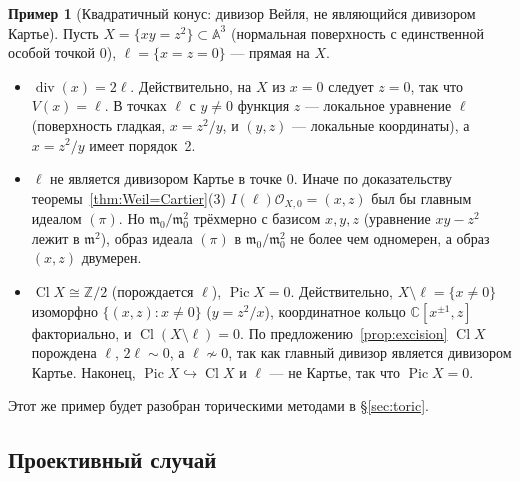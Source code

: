 \documentclass[11pt,a4paper]{article}
\theoremstyle{plain}
\theoremstyle{definition}
\newtheorem{example}[theorem]{Пример}
\theoremstyle{remark}
\renewcommand{\C}{\mathbb{C}}
\newcommand{\Z}{\mathbb{Z}}
\newcommand{\A}{\mathbb{A}}
\newcommand{\cO}{\mathcal{O}}
\newcommand{\mm}{\mathfrak{m}}
\DeclareMathOperator{\Pic}{Pic}
\DeclareMathOperator{\Cl}{Cl}
\DeclareMathOperator{\divv}{div}
\begin{document}
\begin{example}[Квадратичный конус: дивизор Вейля, не являющийся дивизором Картье]\label{ex:cone}
Пусть $X=\{xy=z^2\}\subset\A^3$ (нормальная поверхность с единственной особой точкой $0$),
$\ell=\{x=z=0\}$ --- прямая на $X$.
\begin{itemize}
\item $\divv(x)=2\ell$. Действительно, на $X$ из $x=0$ следует $z=0$, так что
$V(x)=\ell$. В точках $\ell$ с $y\ne0$ функция $z$ --- локальное уравнение $\ell$ (поверхность
гладкая, $x=z^2/y$, и $(y,z)$ --- локальные координаты), а $x=z^2/y$ имеет порядок~2.
\item $\ell$ не является дивизором Картье в точке $0$. Иначе по доказательству
теоремы~\ref{thm:Weil=Cartier}(3) $I(\ell)\cO_{X,0}=(x,z)$ был бы главным идеалом $(\pi)$.
Но $\mm_0/\mm_0^2$ трёхмерно с базисом $x,y,z$ (уравнение $xy-z^2$ лежит в $\mm^2$), образ
идеала $(\pi)$ в $\mm_0/\mm_0^2$ не более чем одномерен, а образ $(x,z)$ двумерен.
\item $\Cl X\cong\Z/2$ (порождается $\ell$), $\Pic X=0$. Действительно, $X\setminus\ell=\{x\ne0\}$
изоморфно $\{(x,z):x\ne0\}$ ($y=z^2/x$), координатное кольцо $\C[x^{\pm1},z]$ факториально,
и $\Cl(X\setminus\ell)=0$. По предложению~\ref{prop:excision} $\Cl X$ порождена $\ell$,
$2\ell\sim0$, а $\ell\not\sim0$, так как главный дивизор является дивизором Картье. Наконец,
$\Pic X\hookrightarrow\Cl X$ и $\ell$ --- не Картье, так что $\Pic X=0$.
\end{itemize}
Этот же пример будет разобран торическими методами в \S\ref{sec:toric}.
\end{example}

\subsection{Проективный случай}
\end{document}
